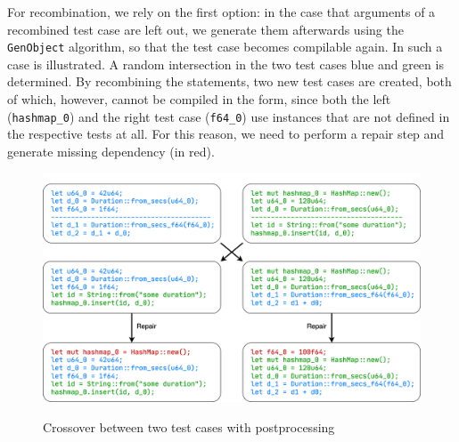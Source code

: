 \documentclass[paper=a4,%
  twoside,%
  BCOR4mm,%
  abstract=true,%
  toc=bibliography,%
  chapterprefix=true,%
  toc=bibliographynumbered,%
  open=right,%
  english,%
  pagesize=pdftex]{scrreprt}
\begin{document}

For recombination, we rely on the first option: in the case that arguments of a recombined test case are left out, we generate them afterwards using the \lstinline{GenObject} algorithm, so that the test case becomes compilable again. In  such a case is illustrated. A random intersection in the two test cases blue and green is determined. By recombining the statements, two new test cases are created, both of which, however, cannot be compiled in the form, since both the left (\lstinline{hashmap_0}) and the right test case (\lstinline{f64_0}) use instances that are not defined in the respective tests at all. For this reason, we need to perform a repair step and generate missing dependency (in red).

\begin{figure}[h]
\caption{Crossover between two test cases with postprocessing}
\centering
\includegraphics[width=\textwidth]{crossover}
\label{fig:crossover-example}
\end{figure}
\end{document}
